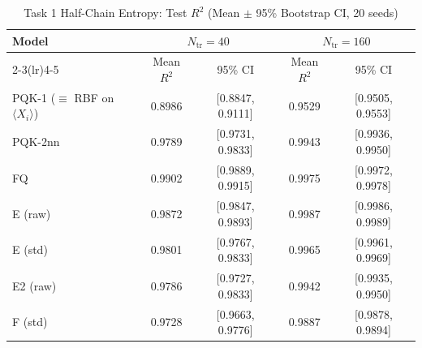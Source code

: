 \begin{table}[!t]
\caption{Task 1 Half-Chain Entropy: Test $R^2$ (Mean $\pm$ 95\% Bootstrap CI, 20 seeds)}
\label{tab:t1_r2}
\centering
\begingroup
\setlength{\tabcolsep}{4pt}
\begin{tabular}{@{}lcccc@{}}
\toprule
\textbf{Model} & \multicolumn{2}{c}{$N_{\mathrm{tr}}=40$} & \multicolumn{2}{c}{$N_{\mathrm{tr}}=160$} \\
\cmidrule(lr){2-3}\cmidrule(lr){4-5}
 & Mean $R^2$ & 95\% CI & Mean $R^2$ & 95\% CI \\
\midrule
PQK-1 ($\equiv$ RBF on $\langle X_i\rangle$) & 0.8986 & [0.8847, 0.9111] & 0.9529 & [0.9505, 0.9553] \\
PQK-2nn & 0.9789 & [0.9731, 0.9833] & 0.9943 & [0.9936, 0.9950] \\
FQ & 0.9902 & [0.9889, 0.9915] & 0.9975 & [0.9972, 0.9978] \\
E (raw) & 0.9872 & [0.9847, 0.9893] & 0.9987 & [0.9986, 0.9989] \\
E (std) & 0.9801 & [0.9767, 0.9833] & 0.9965 & [0.9961, 0.9969] \\
E2 (raw) & 0.9786 & [0.9727, 0.9833] & 0.9942 & [0.9935, 0.9950] \\
F (std) & 0.9728 & [0.9663, 0.9776] & 0.9887 & [0.9878, 0.9894] \\
\bottomrule
\end{tabular}
\endgroup
\end{table}
